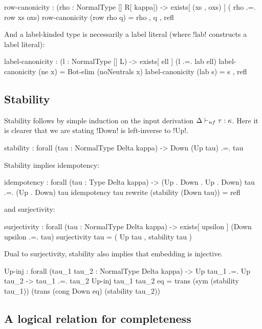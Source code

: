 \documentclass[sigplan,10pt,review]{acmart}\settopmatter{printfolios=true,printccs=false,printacmref=false}
\begin{document}
\begin{agda}
row-canonicity : (rho : NormalType [] R[ kappa]) -> 
                 exists[ (xs , oxs) ]
                 ( rho .=. row xs oxs)
row-canonicity (row rho q) = rho , q , refl
\end{agda}

\Ni And a label-kinded type is necessarily a label literal (where !lab! constructs a label literal):

\begin{agda}
label-canonicity : (l : NormalType [] L) -> 
                   exists[ ell ] (l .=. lab ell)
label-canonicity (ne x) = Bot-elim (noNeutrals x)
label-canonicity (lab s) = s , refl
\end{agda}

\subsection{Stability}

Stability follows by simple induction on the input derivation $\Delta \vdash_{nf} \tau : \kappa$. Here it is clearer that we are stating !Down! is left-inverse to !Up!.

\begin{agda}
stability : forall (tau : NormalType Delta kappa) -> Down (Up tau) .=. tau
\end{agda}
Stability implies idempotency:
\begin{agda}
idempotency : forall (tau : Type Delta kappa) -> 
              (Up . Down . Up . Down) tau .=. (Up . Down) tau
idempotency tau rewrite (stability (Down tau)) = refl
\end{agda}
\Ni and surjectivity: 

\begin{agda}
surjectivity : forall (tau : NormalType Delta kappa) -> 
               exists[ upsilon ] (Down upsilon .=. tau)
surjectivity tau = ( Up tau , stability tau )
\end{agda}

Dual to surjectivity, stability also implies that embedding is injective.

\begin{agda}
Up-inj : forall (tau_1  tau_2 : NormalType Delta kappa) -> 
         Up tau_1 .=. Up tau_2 -> tau_1 .=. tau_2
Up-inj  tau_1  tau_2  eq = 
  trans 
    (sym (stability tau_1))          
    (trans 
      (cong Down eq)
      (stability tau_2))
\end{agda}

\subsection{A logical relation for completeness}
\end{document}

